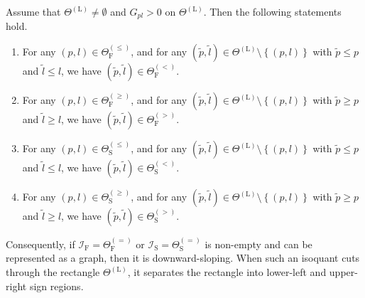 \documentclass[a4paper,12pt]{article}
\begin{document}
\begin{lemma}\label{eq:gradient_property}
Assume that $\Theta^{\left(\text{L}\right)}\neq\emptyset$ and $G_{pl}>0$ on $\Theta^{\left(\text{L}\right)}$. Then the following statements hold.
\begin{enumerate}
\item[(i)] For any $\left(p,l\right)\in\Theta_{\text{F}}^{\left(\leq\right)}$, and for any $\left(\tilde{p},\tilde{l}\right)\in\Theta^{\left(\text{L}\right)}\setminus\left\{\left(p,l\right)\right\}$ with $\tilde{p}\leq p$ and $\tilde{l}\leq l$, we have $\left(\tilde{p},\tilde{l}\right)\in\Theta_{\text{F}}^{\left(<\right)}$.
\item[(ii)] For any $\left(p,l\right)\in\Theta_{\text{F}}^{\left(\geq\right)}$, and for any $\left(\tilde{p},\tilde{l}\right)\in\Theta^{\left(\text{L}\right)}\setminus\left\{\left(p,l\right)\right\}$ with $\tilde{p}\geq p$ and $\tilde{l}\geq l$, we have $\left(\tilde{p},\tilde{l}\right)\in\Theta_{\text{F}}^{\left(>\right)}$.
\item[(iii)] For any $\left(p,l\right)\in\Theta_{\text{S}}^{\left(\leq\right)}$, and for any $\left(\tilde{p},\tilde{l}\right)\in\Theta^{\left(\text{L}\right)}\setminus\left\{\left(p,l\right)\right\}$ with $\tilde{p}\leq p$ and $\tilde{l}\leq l$, we have $\left(\tilde{p},\tilde{l}\right)\in\Theta_{\text{S}}^{\left(<\right)}$.
\item[(iv)] For any $\left(p,l\right)\in\Theta_{\text{S}}^{\left(\geq\right)}$, and for any $\left(\tilde{p},\tilde{l}\right)\in\Theta^{\left(\text{L}\right)}\setminus\left\{\left(p,l\right)\right\}$ with $\tilde{p}\geq p$ and $\tilde{l}\geq l$, we have $\left(\tilde{p},\tilde{l}\right)\in\Theta_{\text{S}}^{\left(>\right)}$.
\end{enumerate}
Consequently, if $\mathcal{I}_{\text{F}}=\Theta_{\text{F}}^{\left(=\right)}$ or $\mathcal{I}_{\text{S}}=\Theta_{\text{S}}^{\left(=\right)}$ is non-empty and can be represented as a graph, then it is downward-sloping. When such an isoquant cuts through the rectangle $\Theta^{\left(\text{L}\right)}$, it separates the rectangle into lower-left and upper-right sign regions.
\end{lemma}
\end{document}
